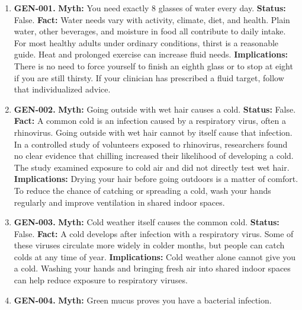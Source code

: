 \documentclass[11pt,oneside]{book}
\begin{document}
\begin{enumerate}[leftmargin=0pt,labelwidth=0pt,labelsep=0pt,itemindent=0pt]
\item[] \textbf{GEN-001.} \textbf{Myth:} You need exactly 8 glasses of water every day.\newline
\textbf{Status:} False.\newline
\textbf{Fact:} Water needs vary with activity, climate, diet, and health. Plain water, other beverages, and moisture in food all contribute to daily intake. For most healthy adults under ordinary conditions, thirst is a reasonable guide. Heat and prolonged exercise can increase fluid needs. \cite{ref292}\newline
\textbf{Implications:} There is no need to force yourself to finish an eighth glass or to stop at eight if you are still thirsty. If your clinician has prescribed a fluid target, follow that individualized advice.
\item[] \textbf{GEN-002.} \textbf{Myth:} Going outside with wet hair causes a cold.\newline
\textbf{Status:} False.\newline
\textbf{Fact:} A common cold is an infection caused by a respiratory virus, often a rhinovirus. Going outside with wet hair cannot by itself cause that infection. \cite{ref4} In a controlled study of volunteers exposed to rhinovirus, researchers found no clear evidence that chilling increased their likelihood of developing a cold. The study examined exposure to cold air and did not directly test wet hair. \cite{ref239}\newline
\textbf{Implications:} Drying your hair before going outdoors is a matter of comfort. To reduce the chance of catching or spreading a cold, wash your hands regularly and improve ventilation in shared indoor spaces. \cite{ref4}
\item[] \textbf{GEN-003.} \textbf{Myth:} Cold weather itself causes the common cold.\newline
\textbf{Status:} False.\newline
\textbf{Fact:} A cold develops after infection with a respiratory virus. Some of these viruses circulate more widely in colder months, but people can catch colds at any time of year.\newline
\textbf{Implications:} Cold weather alone cannot give you a cold. Washing your hands and bringing fresh air into shared indoor spaces can help reduce exposure to respiratory viruses. \cite{ref4}
\item[] \textbf{GEN-004.} \textbf{Myth:} Green mucus proves you have a bacterial infection.\newline

\end{enumerate}
\end{document}
